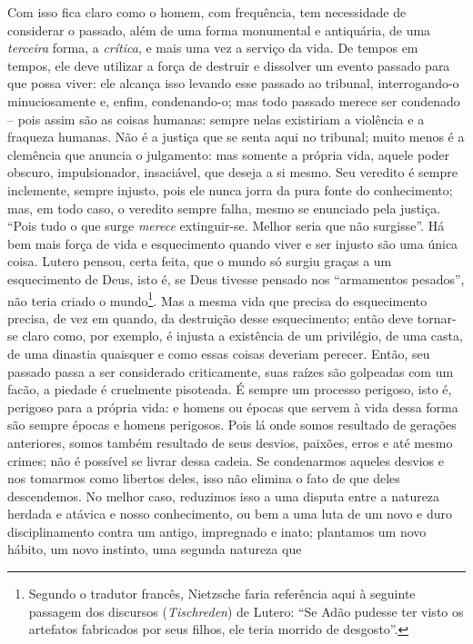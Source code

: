 Com isso fica claro como o homem, com frequência, tem necessidade de
considerar o passado, além de uma forma monumental e antiquária, de uma
\emph{terceira} forma, a \emph{crítica}, e mais uma vez a serviço da
vida. De tempos em tempos, ele deve utilizar a força de destruir e
dissolver um evento passado para que possa viver: ele alcança isso
levando esse passado ao tribunal, interrogando-o minuciosamente e, enfim,
condenando-o; mas todo passado merece ser condenado -- pois assim são as
coisas humanas: sempre nelas existiriam a violência e a fraqueza
humanas. Não é a justiça que se senta aqui no tribunal; muito menos é a
clemência que anuncia o julgamento: mas somente a própria vida, aquele
poder obscuro, impulsionador, insaciável, que deseja a si mesmo. Seu
veredito é sempre inclemente, sempre injusto, pois ele nunca jorra da
pura fonte do conhecimento; mas, em todo caso, o veredito sempre falha,
mesmo se enunciado pela justiça. ``Pois tudo o que surge
\emph{merece} extinguir-se. Melhor seria que não surgisse''. Há bem mais
força de vida e esquecimento quando viver e ser injusto são uma única
coisa. Lutero pensou, certa feita, que o mundo só surgiu graças a um
esquecimento de Deus, isto é, se Deus tivesse pensado nos ``armamentos
pesados'', não teria criado o mundo\footnote{Segundo o tradutor francês,
  Nietz\-sche faria referência aqui à seguinte passagem dos discursos
  (\emph{Tischreden}) de Lutero: ``Se Adão pudesse ter visto os
  artefatos fabricados por seus filhos, ele teria morrido de desgosto''.}.
Mas a mesma vida que precisa do esquecimento precisa, de vez em quando,
da destruição desse esquecimento; então deve tornar-se claro como, por
exemplo, é injusta a existência de um privilégio, de uma casta, de uma
dinastia quaisquer e como essas coisas deveriam perecer. Então, seu
passado passa a ser considerado criticamente, suas raízes são
golpeadas com um facão, a piedade é cruelmente pisoteada. É sempre
um processo perigoso, isto é, perigoso para a própria vida: e homens ou
épocas que servem à vida dessa forma são sempre épocas e homens 
perigosos. Pois lá onde somos resultado de gerações anteriores, somos
também resultado de seus desvios, paixões, erros e até mesmo crimes; não
é possível se livrar dessa cadeia. Se condenarmos aqueles desvios e nos
tomarmos como libertos deles, isso não elimina o fato de que deles
descendemos.\label{delesdescendemos} No melhor caso, reduzimos isso a uma disputa entre a
natureza herdada e atávica e nosso conhecimento, ou bem a uma luta de um
novo e duro disciplinamento contra um antigo, impregnado e inato;
plantamos um novo hábito, um novo instinto, uma segunda natureza que
